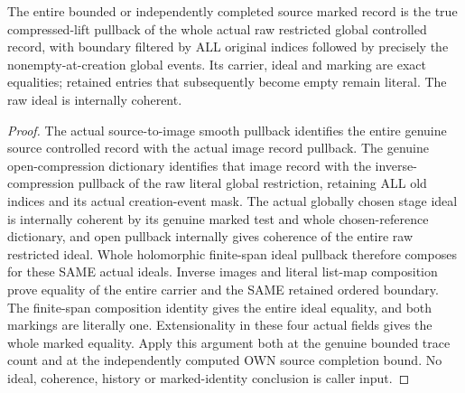 \begin{theorem}
\label{hir:submersion-compressed-image-trace-whole-controls}
\leanok
{}

The entire bounded or independently completed source marked record is the true compressed-lift pullback of the whole actual raw restricted global controlled record, with boundary filtered by ALL original indices followed by precisely the nonempty-at-creation global events. Its carrier, ideal and marking are exact equalities; retained entries that subsequently become empty remain literal. The raw ideal is internally coherent.
\end{theorem}
\begin{proof}
The actual source-to-image smooth pullback identifies the entire genuine source controlled record with the actual image record pullback. The genuine open-compression dictionary identifies that image record with the inverse-compression pullback of the raw literal global restriction, retaining ALL old indices and its actual creation-event mask. The actual globally chosen stage ideal is internally coherent by its genuine marked test and whole chosen-reference dictionary, and open pullback internally gives coherence of the entire raw restricted ideal. Whole holomorphic finite-span ideal pullback therefore composes for these SAME actual ideals. Inverse images and literal list-map composition prove equality of the entire carrier and the SAME retained ordered boundary. The finite-span composition identity gives the entire ideal equality, and both markings are literally one. Extensionality in these four actual fields gives the whole marked equality. Apply this argument both at the genuine bounded trace count and at the independently computed OWN source completion bound. No ideal, coherence, history or marked-identity conclusion is caller input.
\end{proof}
